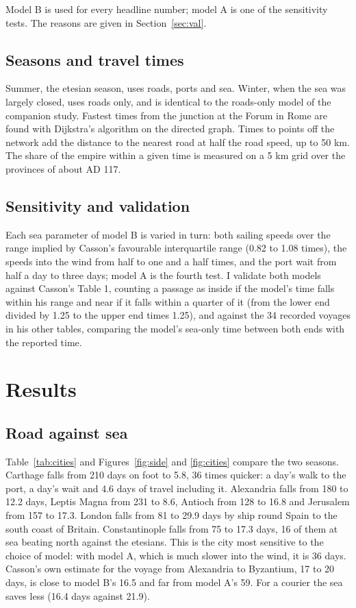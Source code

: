 \documentclass[11pt,a4paper]{article}
\begin{document}
Model B is used for every headline number; model A is one of the sensitivity tests. The reasons are given in Section~\ref{sec:val}.

\subsection{Seasons and travel times}
Summer, the etesian season, uses roads, ports and sea. Winter, when the sea was largely closed, uses roads only, and is identical to the roads-only model of the companion study. Fastest times from the junction at the Forum in Rome are found with Dijkstra's algorithm \citep{dijkstra1959} on the directed graph. Times to points off the network add the distance to the nearest road at half the road speed, up to 50 km. The share of the empire within a given time is measured on a 5 km grid over the provinces of about AD 117.

\subsection{Sensitivity and validation}
Each sea parameter of model B is varied in turn: both sailing speeds over the range implied by Casson's favourable interquartile range (0.82 to 1.08 times), the speeds into the wind from half to one and a half times, and the port wait from half a day to three days; model A is the fourth test. I validate both models against Casson's Table 1, counting a passage as inside if the model's time falls within his range and near if it falls within a quarter of it (from the lower end divided by 1.25 to the upper end times 1.25), and against the 34 recorded voyages in his other tables, comparing the model's sea-only time between both ends with the reported time.

\section{Results}
\subsection{Road against sea}
Table~\ref{tab:cities} and Figures~\ref{fig:side} and \ref{fig:cities} compare the two seasons. Carthage falls from 210 days on foot to 5.8, 36 times quicker: a day's walk to the port, a day's wait and 4.6 days of travel including it. Alexandria falls from 180 to 12.2 days, Leptis Magna from 231 to 8.6, Antioch from 128 to 16.8 and Jerusalem from 157 to 17.3. London falls from 81 to 29.9 days by ship round Spain to the south coast of Britain. Constantinople falls from 75 to 17.3 days, 16 of them at sea beating north against the etesians. This is the city most sensitive to the choice of model: with model A, which is much slower into the wind, it is 36 days. Casson's own estimate for the voyage from Alexandria to Byzantium, 17 to 20 days, is close to model B's 16.5 and far from model A's 59. For a courier the sea saves less (16.4 days against 21.9).
\end{document}
